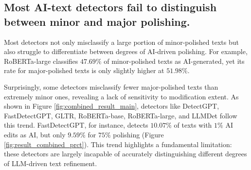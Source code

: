 \iffalse
\begin{figure}
    \centering
    \texttt{[image: images/result\_plots/combined\_model\_polish\_type\_vs\_mgt\_llama2.png]}
    \caption{Caption}
    \label{fig:enter-label}
\end{figure}

\begin{figure}
    \centering
    \texttt{[image: images/result\_plots/combined\_model\_polish\_type\_vs\_mgt\_gpt.png]}
    \caption{Caption}
    \label{fig:enter-label}
\end{figure}
\fi



\subsection{Most AI-text detectors fail to distinguish between minor and major polishing.} 

Most detectors not only misclassify a large portion of minor-polished texts but also struggle to differentiate between degrees of AI-driven polishing. For example, RoBERTa-large classifies $47.69\%$ of minor-polished texts as AI-generated, yet its rate for major-polished texts is only slightly higher at $51.98\%$.


Surprisingly, some detectors misclassify fewer major-polished texts than extremely minor ones, revealing a lack of sensitivity to modification extent. As shown in Figure \ref{fig:combined_result_main}, detectors like DetectGPT, FastDetectGPT, GLTR, RoBERTa-base, RoBERTa-large, and LLMDet follow this trend. FastDetectGPT, for instance, detects $10.07\%$ of texts with $1\%$ AI edits as AI, but only $9.59\%$ for $75\%$ polishing (Figure \ref{fig:result_combined_prct}).
This trend highlights a fundamental limitation: these detectors are largely incapable of accurately distinguishing different degrees of LLM-driven text refinement.


